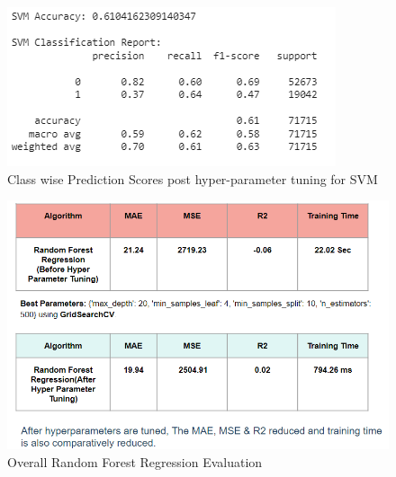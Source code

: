 \documentclass[journal,transmag]{J-NaNA}
\begin{document}
\begin{figure}[htbp]
\centering
\includegraphics[width=\linewidth]{svm-classlevel.PNG} 
\caption{Class wise Prediction Scores post hyper-parameter tuning for SVM} 
\label{fig: post-hyper-parameter-tuning} %
\end{figure}

\begin{figure}[htbp]
\centering
\includegraphics[width=\linewidth]{Model Evaluation 1 Metrics.png} 
\caption{Overall Random Forest Regression Evaluation} 
\label{fig: post-hyper-parameter-tuning} %
\end{figure}
\end{document}
